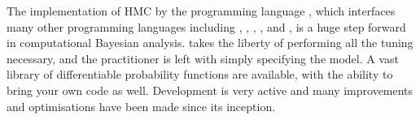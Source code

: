 The implementation of HMC by the programming language , which interfaces many other programming languages including , , , ,  and , is a huge step forward in computational Bayesian analysis.
 takes the liberty of performing all the tuning necessary, and the practitioner is left with simply specifying the model. 
A vast library of differentiable probability functions are available, with the ability to bring your own code as well.
Development is very active and many improvements and optimisations have been made since its inception.

